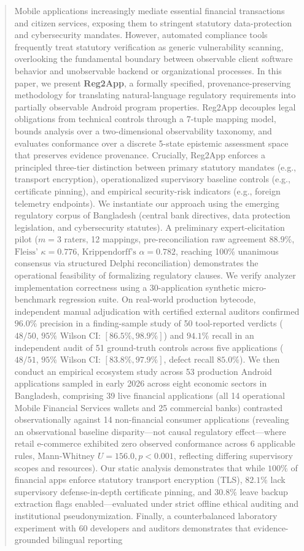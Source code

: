 \begin{abstract}
Mobile applications increasingly mediate essential financial transactions and citizen services, exposing them to stringent statutory data-protection and cybersecurity mandates. However, automated compliance tools frequently treat statutory verification as generic vulnerability scanning, overlooking the fundamental boundary between observable client software behavior and unobservable backend or organizational processes. In this paper, we present \textbf{Reg2App}, a formally specified, provenance-preserving methodology for translating natural-language regulatory requirements into partially observable Android program properties. Reg2App decouples legal obligations from technical controls through a 7-tuple mapping model, bounds analysis over a two-dimensional observability taxonomy, and evaluates conformance over a discrete 5-state epistemic assessment space that preserves evidence provenance. Crucially, Reg2App enforces a principled three-tier distinction between primary statutory mandates (e.g., transport encryption), operationalized supervisory baseline controls (e.g., certificate pinning), and empirical security-risk indicators (e.g., foreign telemetry endpoints). We instantiate our approach using the emerging regulatory corpus of Bangladesh (central bank directives, data protection legislation, and cybersecurity statutes). A preliminary expert-elicitation pilot ($m=3$ raters, 12 mappings, pre-reconciliation raw agreement $88.9\%$, $\text{Fleiss' } \kappa = 0.776$, $\text{Krippendorff's } \alpha = 0.782$, reaching 100\% unanimous consensus via structured Delphi reconciliation) demonstrates the operational feasibility of formalizing regulatory clauses. We verify analyzer implementation correctness using a 30-application synthetic micro-benchmark regression suite. On real-world production bytecode, independent manual adjudication with certified external auditors confirmed $96.0\%$ precision in a finding-sample study of 50 tool-reported verdicts ($48/50$, $95\%$ Wilson CI: $[86.5\%, 98.9\%]$) and $94.1\%$ recall in an independent audit of 51 ground-truth controls across five applications ($48/51$, $95\%$ Wilson CI: $[83.8\%, 97.9\%]$, defect recall $85.0\%$). We then conduct an empirical ecosystem study across 53 production Android applications sampled in early 2026 across eight economic sectors in Bangladesh, comprising 39 live financial applications (all 14 operational Mobile Financial Services wallets and 25 commercial banks) contrasted observationally against 14 non-financial consumer applications (revealing an observational baseline disparity—not causal regulatory effect—where retail e-commerce exhibited zero observed conformance across 6 applicable rules, Mann-Whitney $U = 156.0, p < 0.001$, reflecting differing supervisory scopes and resources). Our static analysis demonstrates that while $100\%$ of financial apps enforce statutory transport encryption (TLS), $82.1\%$ lack supervisory defense-in-depth certificate pinning, and $30.8\%$ leave backup extraction flags enabled—evaluated under strict offline ethical auditing and institutional pseudonymization. Finally, a counterbalanced laboratory experiment with 60 developers and auditors demonstrates that evidence-grounded bilingual reporting 
\end{abstract}
